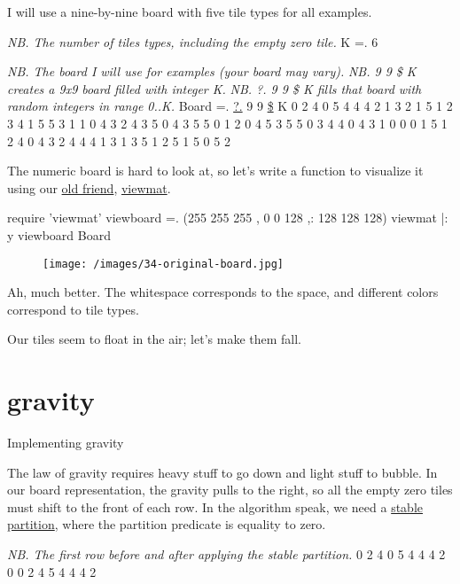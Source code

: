 \documentclass{article}
\begin{document}
I will use a nine-by-nine board with five tile types for all examples.

\begin{code}[j]
\emph{NB. The number of tiles types, including the empty zero tile.}
   K =. 6

\emph{NB. The board I will use for examples (your board may vary).}
\emph{NB. 9 9 \$ K creates a 9x9 board filled with integer K. }
\emph{NB. ?. 9 9 \$ K fills that board with random integers in range 0..K. }
   Board =. \href{https://code.jsoftware.com/wiki/Vocabulary/querydot}{?.} 9 9 \href{https://code.jsoftware.com/wiki/Vocabulary/dollar#dyadic}{\$} K
0 2 4 0 5 4 4 4 2
1 3 2 1 5 1 2 3 4
1 5 5 3 1 1 0 4 3
2 4 3 5 0 4 3 5 5
0 1 2 0 4 5 3 5 5
0 3 4 4 0 4 3 1 0
0 0 1 5 1 2 4 0 4
3 2 4 4 4 1 3 1 3
5 1 2 5 1 5 0 5 2
\end{code}

The numeric board is hard to look at, so let's write a function to visualize it using our \href{/posts/04-square-joy-trapped-rain-water.html#viewmat}{old friend}, \href{https://code.jsoftware.com/wiki/Studio/Viewmat}{viewmat}.

\begin{code}[j]
   require 'viewmat'
   viewboard =. {{ (255 255 255 , 0 0 128 ,: 128 128 128) viewmat |: y }}
   viewboard Board
\end{code}

\begin{figure}
\texttt{[image: /images/34-original-board.jpg]}
\end{figure}

Ah, much better.
The whitespace corresponds to the space,
and different colors correspond to tile types.

Our tiles seem to float in the air; let's make them fall.

\section{gravity}{Implementing gravity}

The law of gravity requires heavy stuff to go down and light stuff to bubble.
In our board representation, the gravity pulls to the right,
so all the empty zero tiles must shift to the front of each row.
In the algorithm speak, we need a \href{https://en.cppreference.com/w/cpp/algorithm/stable_partition}{stable partition},
where the partition predicate is equality to zero.

\begin{code}
   \emph{NB. The first row before and after applying the stable partition.}
0 2 4 0 5 4 4 4 2
0 0 2 4 5 4 4 4 2
\end{code}
\end{document}
